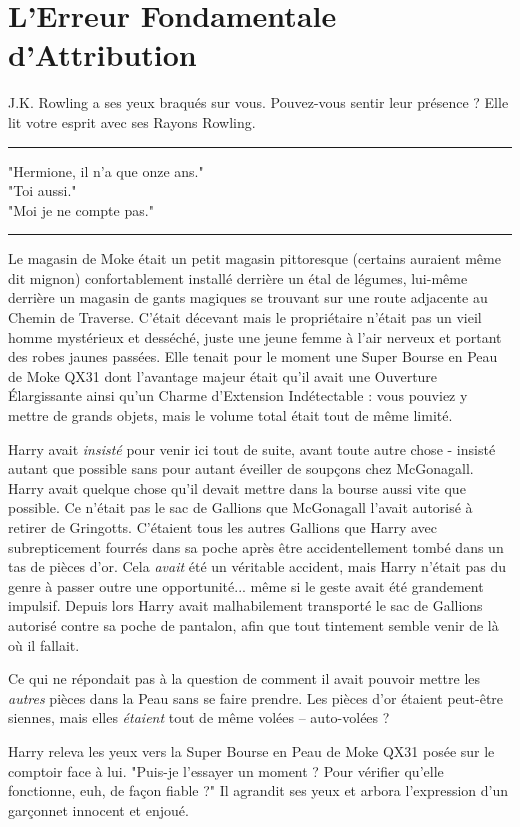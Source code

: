 
\chapter{L'Erreur Fondamentale d'Attribution}

J.K. Rowling a ses yeux braqués sur vous. Pouvez-vous sentir leur présence ? Elle lit votre esprit avec ses Rayons Rowling.
\par\noindent\rule{\textwidth}{0.4pt}
"Hermione, il n'a que onze ans."\\"Toi aussi."\\"Moi je ne compte pas."
\par\noindent\rule{\textwidth}{0.4pt}
Le magasin de Moke était un petit magasin pittoresque (certains auraient même dit mignon) confortablement installé derrière un étal de légumes, lui-même derrière un magasin de gants magiques se trouvant sur une route adjacente au Chemin de Traverse. C'était décevant mais le propriétaire n'était pas un vieil homme mystérieux et desséché, juste une jeune femme à l'air nerveux et portant des robes jaunes passées. Elle tenait pour le moment une Super Bourse en Peau de Moke QX31 dont l'avantage majeur était qu'il avait une Ouverture Élargissante ainsi qu'un Charme d'Extension Indétectable : vous pouviez y mettre de grands objets, mais le volume total était tout de même limité.

Harry avait \emph{insisté}  pour venir ici tout de suite, avant toute autre chose - insisté autant que possible sans pour autant éveiller de soupçons chez McGonagall. Harry avait quelque chose qu'il devait mettre dans la bourse aussi vite que possible. Ce n'était pas le sac de Gallions que McGonagall l'avait autorisé à retirer de Gringotts. C'étaient tous les autres Gallions que Harry avec subrepticement fourrés dans sa poche après être accidentellement tombé dans un tas de pièces d'or. Cela \emph{avait}  été un véritable accident, mais Harry n'était pas du genre à passer outre une opportunité... même si le geste avait été grandement impulsif. Depuis lors Harry avait malhabilement transporté le sac de Gallions autorisé contre sa poche de pantalon, afin que tout tintement semble venir de là où il fallait.

Ce qui ne répondait pas à la question de comment il avait pouvoir mettre les \emph{autres}  pièces dans la Peau sans se faire prendre. Les pièces d'or étaient peut-être siennes, mais elles \emph{étaient}  tout de même volées – auto-volées ?

Harry releva les yeux vers la Super Bourse en Peau de Moke QX31 posée sur le comptoir face à lui. "Puis-je l'essayer un moment ? Pour vérifier qu'elle fonctionne, euh, de façon fiable ?" Il agrandit ses yeux et arbora l'expression d'un garçonnet innocent et enjoué.

